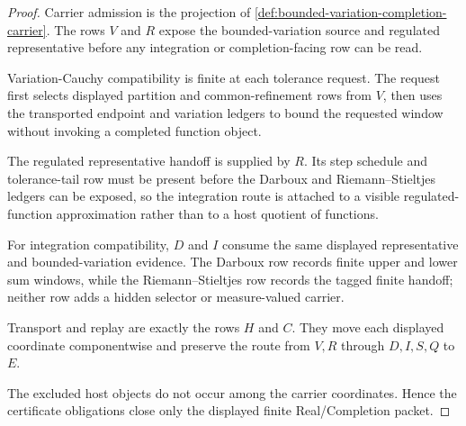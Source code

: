 \begin{proof}
Carrier admission is the projection of \autoref{def:bounded-variation-completion-carrier}. The rows $V$ and $R$ expose the bounded-variation source and regulated representative before any integration or completion-facing row can be read.

Variation-Cauchy compatibility is finite at each tolerance request. The request first selects displayed partition and common-refinement rows from $V$, then uses the transported endpoint and variation ledgers to bound the requested window without invoking a completed function object.

The regulated representative handoff is supplied by $R$. Its step schedule and tolerance-tail row must be present before the Darboux and Riemann--Stieltjes ledgers can be exposed, so the integration route is attached to a visible regulated-function approximation rather than to a host quotient of functions.

For integration compatibility, $D$ and $I$ consume the same displayed representative and bounded-variation evidence. The Darboux row records finite upper and lower sum windows, while the Riemann--Stieltjes row records the tagged finite handoff; neither row adds a hidden selector or measure-valued carrier.

Transport and replay are exactly the rows $H$ and $C$. They move each displayed coordinate componentwise and preserve the route from $V,R$ through $D,I,S,Q$ to $E$.

The excluded host objects do not occur among the carrier coordinates. Hence the certificate obligations close only the displayed finite Real/Completion packet.
\end{proof}

